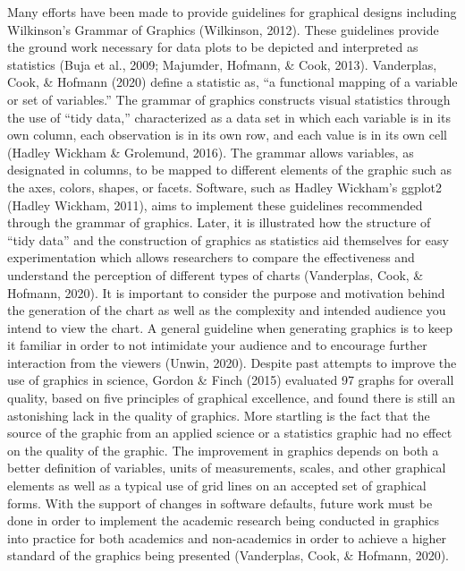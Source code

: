 \documentclass[print]{nuthesis}
\begin{document}
Many efforts have been made to provide guidelines for graphical designs including Wilkinson's Grammar of Graphics (Wilkinson, 2012).
These guidelines provide the ground work necessary for data plots to be depicted and interpreted as statistics (Buja et al., 2009; Majumder, Hofmann, \& Cook, 2013).
Vanderplas, Cook, \& Hofmann (2020) define a statistic as, ``a functional mapping of a variable or set of variables.''
The grammar of graphics constructs visual statistics through the use of ``tidy data,'' characterized as a data set in which each variable is in its own column, each observation is in its own row, and each value is in its own cell (Hadley Wickham \& Grolemund, 2016).
The grammar allows variables, as designated in columns, to be mapped to different elements of the graphic such as the axes, colors, shapes, or facets.
Software, such as Hadley Wickham's ggplot2 (Hadley Wickham, 2011), aims to implement these guidelines recommended through the grammar of graphics.
Later, it is illustrated how the structure of ``tidy data'' and the construction of graphics as statistics aid themselves for easy experimentation which allows researchers to compare the effectiveness and understand the perception of different types of charts (Vanderplas, Cook, \& Hofmann, 2020).
It is important to consider the purpose and motivation behind the generation of the chart as well as the complexity and intended audience you intend to view the chart. 
A general guideline when generating graphics is to keep it familiar in order to not intimidate your audience and to encourage further interaction from the viewers (Unwin, 2020).
Despite past attempts to improve the use of graphics in science, Gordon \& Finch (2015) evaluated 97 graphs for overall quality, based on five principles of graphical excellence, and found there is still an astonishing lack in the quality of graphics.
More startling is the fact that the source of the graphic from an applied science or a statistics graphic had no effect on the quality of the graphic.
The improvement in graphics depends on both a better definition of variables, units of measurements, scales, and other graphical elements as well as a typical use of grid lines on an accepted set of graphical forms.
With the support of changes in software defaults, future work must be done in order to implement the academic research being conducted in graphics into practice for both academics and non-academics in order to achieve a higher standard of the graphics being presented (Vanderplas, Cook, \& Hofmann, 2020).
\end{document}
